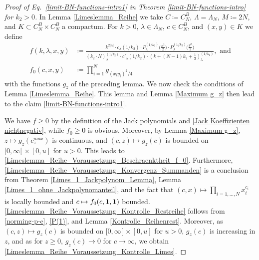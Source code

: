 \documentclass[reqno]{amsart}
\theoremstyle{plain}
\theoremstyle{definition}
\numberwithin{equation}{section}
\newcommand{\ra}{\rightarrow}
\begin{document}
\begin{proof}[Proof of Eq.~\eqref{limit-BN-functions-intro1} in Theorem \ref{limit-BN-functions-intro} for $k_2>0$]
  In  Lemma \ref{Limeslemma_Reihe}
we  take $C \coloneqq C_N^B$, $\Lambda=\Lambda_N$, $M \coloneqq 2N$,
and  $K \subset C_N^B \times C_N^B$ a compactum.
For  $k>0$, $\lambda\in\Lambda_N$, $c \in C_N^B$, and $(x,y) \in K$ we define
\begin{align*}
f(k,\lambda,x,y) 
&\coloneqq
\frac
{k^{2|\lambda|} \cdot c_{\lambda}(1/k_2) \cdot P_{\lambda}^{(1/k_2)}\big(\frac{x^2}{2}\big) \cdot P_{\lambda}^{(1/k_2)}\big(\frac{y^2}{2}\big)}
{(k_2 \cdot N)_{\lambda}^{(1/k_2)} \cdot c'_{\lambda}(1/k_2) \cdot (k + (N-1)k_2 + \frac{1}{2})_{\lambda}^{(1/k_2)}}, \text{ and} \\
f_0(c,x,y) &\coloneqq 
\prod\limits_{i=1}^N g_{(x_i y_i)^2/4}
\end{align*}
with the functions $g_z$ of the preceding lemma.
We now check the conditions of Lemma \ref{Limeslemma_Reihe}.
This lemma and Lemma \ref{Maximum g_z} then lead to the claim \eqref{limit-BN-functions-intro1}.


We have  $f \geq 0$  by the definition of the Jack polynomials and  \eqref{Jack Koeffizienten nichtnegativ}, while 
 $f_0 \geq 0$ is obvious. Moreover, by Lemma \ref{Maximum g_z},
 $z \mapsto g_z(c^{max}_z)$ is continuous, and  $(c,z) \mapsto g_z(c)$ is bounded on $[0, \infty[\, \times [0,u]$ for  $u>0$. 
This leads to \eqref{Limeslemma_Reihe_Voraussetzung_Beschraenktheit_f_0}.
Furthermore, \eqref{Limeslemma_Reihe_Voraussetzung_Konvergenz_Summanden} is a conclusion from Theorem \ref{Limes_1_Jackpolynom_Lemma},
Lemma \ref{Limes_1_ohne_Jackpolynomanteil}, and the fact that  $(c,x) \mapsto \prod_{i=1,\ldots,N} x_i^{c_i}$ is locally bounded and 
 $c \mapsto f_0(c, {\bf 1}, {\bf 1})$  bounded.
 \eqref{Limeslemma_Reihe_Voraussetzung_Kontrolle_Restreihe} follows from \eqref{norming-p-c}, \eqref{P(1)}, and Lemma \ref{Kontrolle_Reihenrest}. Moreover, as $(c,z) \mapsto g_z(c)$ is bounded on $[0, \infty[\, \times [0,u]$ for  $u>0$, 
$g_z(c)$ is increasing in $z$, and as   for  $z \geq 0$, $g_z(c) \ra 0$ for $c \ra \infty$, we obtain  \eqref{Limeslemma_Reihe_Voraussetzung_Kontrolle_Limes}.



\end{proof}
\end{document}
